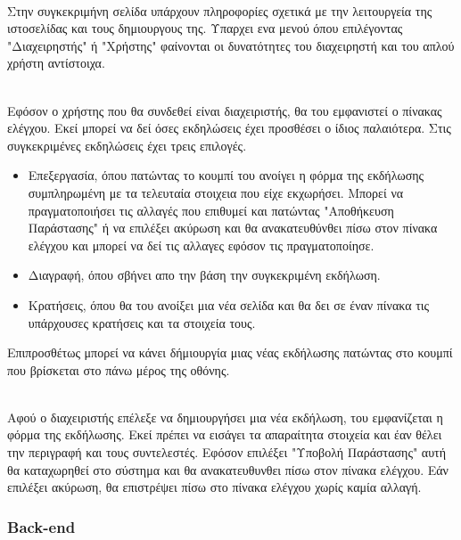 \documentclass{acmart}
\begin{document}
\hfill\\
Στην συγκεκριμήνη σελίδα υπάρχουν πληροφορίες σχετικά με την λειτουργεία της ιστοσελίδας και τους δημιουργους της. Υπαρχει ενα μενού όπου επιλέγοντας "Διαχειρηστής" ή "Χρήστης" φαίνονται οι δυνατότητες του διαχειρηστή και του απλού χρήστη αντίστοιχα.

\hfill\\
Εφόσον ο χρήστης που θα συνδεθεί είναι διαχειριστής, θα του εμφανιστεί ο πίνακας ελέγχου. Εκεί μπορεί να δεί όσες εκδηλώσεις έχει προσθέσει ο ίδιος παλαιότερα. Στις συγκεκριμένες εκδηλώσεις έχει τρεις επιλογές.

\begin{itemize}
  \item Επεξεργασία, όπου πατώντας το κουμπί του ανοίγει η φόρμα της εκδήλωσης συμπληρωμένη με τα τελευταία στοιχεια που είχε εκχωρήσει. Μπορεί να πραγματοποιήσει τις αλλαγές που επιθυμεί και πατώντας "Αποθήκευση Παράστασης" ή να επιλέξει ακύρωση και θα ανακατευθύνθει πίσω στον πίνακα ελέγχου και μπορεί να δεί τις αλλαγες εφόσον τις πραγματοποίησε. 
  \item Διαγραφή, όπου σβήνει απο την βάση την συγκεκριμένη εκδήλωση.
  \item Κρατήσεις, όπου θα του ανοίξει μια νέα σελίδα και θα δει σε έναν πίνακα τις υπάρχουσες κρατήσεις και τα στοιχεία τους.
\end{itemize}

Επιπροσθέτως μπορεί να κάνει δήμιουργία μιας νέας εκδήλωσης πατώντας στο κουμπί που βρίσκεται στο πάνω μέρος της οθόνης.

\hfill\\
Αφού ο διαχειριστής επέλεξε να δημιουργήσει μια νέα εκδήλωση, του εμφανίζεται η φόρμα της εκδήλωσης. Εκεί πρέπει να εισάγει τα απαραίτητα στοιχεία και έαν θέλει την περιγραφή και τους συντελεστές. Εφόσον επιλέξει "Υποβολή Παράστασης" αυτή θα καταχωρηθεί στο σύστημα και θα ανακατευθυνθει πίσω στον πίνακα ελέγχου. Εάν επιλέξει ακύρωση, θα επιστρέψει πίσω στο πίνακα ελέγχου χωρίς καμία αλλαγή.


\subsubsection{Back-end}
\end{document}
